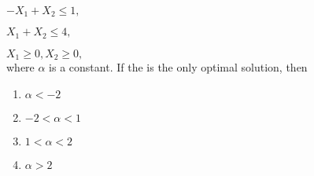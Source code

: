 \documentclass[journal]{IEEEtran}
\begin{document}
\begin{enumerate}
\hspace{1.6cm} $-X_1+X_2\leq 1,$

\hspace{1.6cm} $X_1+X_2\leq 4,$

\hspace{1.6cm} $X_1\geq 0,X_2\geq 0,$
\\where $\alpha$ is a constant. If the  is the only optimal solution, then 
\begin{multicols}{4}
    \begin{enumerate}
        \item $\alpha <-2$
        \item $-2<\alpha<1$
        \item $1<\alpha<2$
        \item $\alpha>2$
    \end{enumerate}
\end{multicols}
\end{enumerate}
\end{document}

